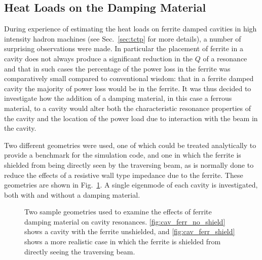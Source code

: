 \subsection{Heat Loads on the Damping Material}

During experience of estimating the heat loads on ferrite damped cavities in high intensity hadron machines (see Sec.~\ref{sec:tctp} for more details), a number of surprising observations were made. In particular the placement of ferrite in a cavity does not always produce a significant reduction in the $Q$ of a resonance and that in such cases the percentage of the power loss in the ferrite was comparatively small compared to conventional wisdom: that in a ferrite damped cavity the majority of power loss would be in the ferrite. It was thus decided to investigate how the addition of a damping material, in this case a ferrous material, to a cavity would alter both the characteristic resonance properties of the cavity and the location of the power load due to interaction with the beam in the cavity.

Two different geometries were used, one of which could be treated analytically to provide a benchmark for the simulation code, and one in which the ferrite is shielded from being directly seen by the traversing beam, as is normally done to reduce the effects of a resistive wall type impedance due to the ferrite. These geometries are shown in Fig.~\ref{fig:ferr_cav_res}. A single eigenmode of each cavity is investigated, both with and without a damping material. 

\begin{figure}
\caption{Two sample geometries used to examine the effects of ferrite damping material on cavity resonances. \ref{fig:cav_ferr_no_shield} shows a cavity with the ferrite unshielded, and \ref{fig:cav_ferr_shield} shows a more realistic case in which the ferrite is shielded from directly seeing the traversing beam.}
\label{fig:ferr_cav_res}
\end{figure}

